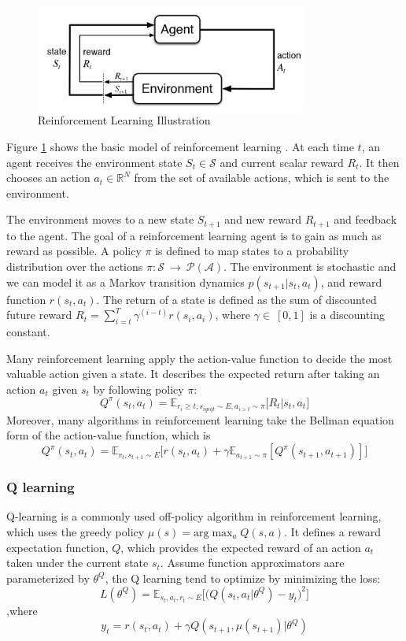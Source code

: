 \documentclass[a4paper]{article}
\begin{document}
\begin{figure}
    \centering
    \includegraphics[width=0.8\textwidth]{./figures/rl.png}
    \caption{ Reinforcement Learning Illustration \cite{rlIntroduction}}
    \label{fig:RL}
\end{figure}


Figure \ref{fig:RL} shows the basic model of reinforcement learning \cite{rlIntroduction}. At
each time $t$, an agent receives the environment state $S_t \in \mathcal{S}$ and current scalar
reward $R_t$. It then chooses an action $a_t \in \mathbb{R}^N$ from the set of available
actions, which is sent to the environment. 

The
environment moves to a new state $S_{t+1}$ and new reward $R_{t+1}$ and feedback to the agent.
The goal of a reinforcement learning agent is to gain as much as reward as possible. A policy
$\pi$ is defined to map states to a probability distribution over the actions $\pi : \mathcal{S}
\ \rightarrow\ \mathcal{P}(\mathcal{A})$. The environment is stochastic and we can model it as
a Markov transition dynamics $p(s_{t+1} | s_t, a_t)$, and reward function $r(s_t, a_t)$.
The return of a state is defined as the sum of discounted future reward $R_t = \sum\limits_{i=t}
^{T}{\gamma^{(i-t)} r(s_i, a_i)}$, where $\gamma \in\ [0,1]$ is a discounting constant. 

Many reinforcement learning apply the action-value function to decide the most valuable action
given a state. It describes the expected return after taking an action $a_t$ given $s_t$ by
following policy $\pi$:
\[
    Q^{\pi}(s_t, a_t) = \mathbb{E}_{r_i \geq t, s_{i geq t} \sim E, a_{i > t} \sim \pi}
    {\big[ R_t | s_t, a_t \big]}
\]
Moreover, many algorithms in reinforcement learning take the Bellman equation form of the
action-value function, which is
\[
    Q^{\pi}(s_t, a_t) = \mathbb{E}_{r_t, s_{t+1} \sim E}
    {\big[ r(s_t, a_t) + \gamma \mathbb{E}_{a_{t+1} \sim \pi}{[Q^{\pi}(s_{t+1}, a_{t+1})]} \big]}
\]


\subsubsection{Q learning}
Q-learning \cite{qlearning} is a commonly used off-policy algorithm in reinforcement learning,
which uses the greedy policy $\mu(s) = \text{arg} \max_a{Q(s,a)}$. It defines a reward
expectation function, $Q$, which provides the expected reward of an action $a_t$ taken under the
current state $s_t$. Assume function approximators aare parameterized by $\theta^Q$, the Q learning
tend to optimize by minimizing the loss:
\[
    L(\theta^Q) = \mathbb{E}_{s_t, a_t, r_t \sim E}{\Bigg[ \big( Q(s_t, a_t | \theta^Q)
                                        - y_t\big)^2 \Bigg]} 
\]
,where
\[
    y_t = r(s_t, a_t) + \gamma Q(s_{t+1}, \mu(s_{t+1}) | \theta^Q)
\]
\end{document}
